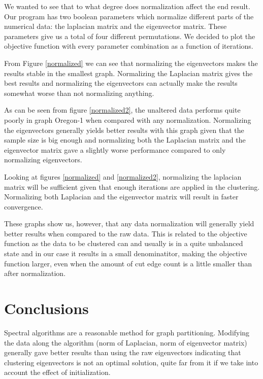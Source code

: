 \documentclass{article}
\begin{document}
\clearpage
We wanted to see that to what degree does normalization affect the end result.
Our program has two boolean parameters which normalize different parts of the numerical
data: the laplacian matrix and the eigenvector matrix. These parameters give us a total of 
four different permutations. We decided to plot the objective function with every parameter 
combination as a function of iterations. 

From Figure \ref{normalized} we can see that normalizing the eigenvectors
makes the results stable in the smallest graph. Normalizing the Laplacian matrix gives the best results and
normalizing the eigenvectors can actually make the results somewhat worse than
not normalizing anything.

As can be seen from figure \ref{normalized2}, 
the unaltered data performs quite poorly in graph Oregon-1 when compared with any normalization. Normalizing 
the eigenvectors generally yields better results with this graph given that the sample
size is big enough and normalizing both the Laplacian matrix and the eigenvector matrix
gave a slightly worse performance compared to only normalizing eigenvectors. 

Looking at figures \ref{normalized} and \ref{normalized2}, normalizing the laplacian matrix will be sufficient
given that enough iterations are applied in the clustering. Normalizing both Laplacian and the eigenvector
matrix will result in faster convergence.

These graphs show us, however, that any data normalization will generally yield better results when 
compared to the raw data. This is related to the objective function as the data to be clustered
can and usually is in a quite unbalanced state and in our case it results in a small denominatitor, making
the objective function larger, even when the amount of cut edge count is a little smaller than after
normalization.

\clearpage
\section{Conclusions}

Spectral algorithms are a reasonable method for graph partitioning. Modifying the data along the algorithm 
(norm of Laplacian, norm of eigenvector matrix) generally gave better results than using the raw eigenvectors
indicating that clustering eigenvectors is not an optimal solution, quite far from it if we take into account
the effect of initialization. 
\end{document}
